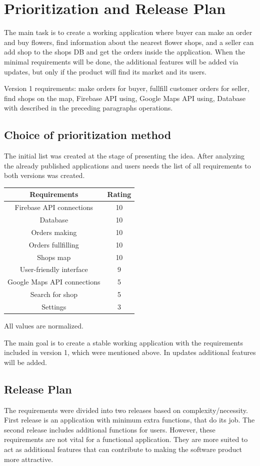 \documentclass{scrreprt}
\begin{document}
\chapter{Prioritization and Release Plan}
The main task is to create a working application where buyer can make an order and buy flowers, find information about the nearest flower shops, and a seller can add shop to the shops DB and get the orders inside the application. When the minimal requirements will be done, the additional features will be added via updates, but only if the product will find its market and its users.

Version 1 requirements: make orders for buyer, fullfill customer orders for seller, find shops on the map, Firebase API using, Google Maps API using, Database with  described in the preceding paragraphs operations.

\section{Choice of prioritization method}
The initial list was created at the stage of presenting the idea. After analyzing the already published applications and users needs the list of all requirements to both versions was created.

\begin{tabular}{| c | c |} \hline
\textbf {Requirements} & \textbf{Rating} \\ \hline
Firebase API connections & 10\\ \hline
Database & 10\\ \hline
Orders making & 10\\ \hline
Orders fullfilling & 10\\ \hline
Shops map & 10\\ \hline
User-friendly interface & 9\\ \hline
Google Maps API connections & 5\\ \hline
Search for shop & 5\\ \hline
Settings & 3\\ \hline
\end{tabular}

All values are normalized. 

The main goal is to create a stable working application with the requirements included in version 1, which were mentioned above. In updates additional features will be added. 

\section{Release Plan}
The requirements were divided into two releases based on complexity/necessity. First release is an application with minimum extra functions, that do its job. The second release includes additional functions for users. However, these requirements are not vital for a functional application. They are more suited to act as additional features that can contribute to making the software product more attractive.
\end{document}
